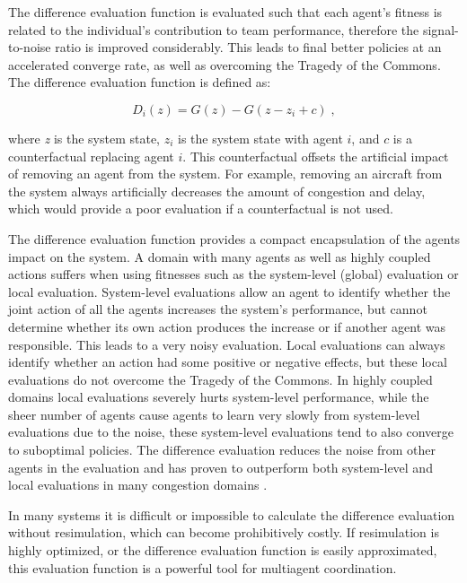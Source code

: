 \documentclass{sig-alternate}
\begin{document}
The difference evaluation function \cite{tumer-wolpert_jair02} is evaluated such that each agent's fitness is related to the individual's contribution to team performance, therefore the signal-to-noise ratio is improved considerably. This leads to final better policies at an accelerated converge rate, as well as overcoming the Tragedy of the Commons. The difference evaluation function is defined as:

\begin{equation}
D_i(z) = G(z) - G(z - z_i + c)\;,
\end{equation}

where \textit{z} is the system state, $z_i$ is the system state with agent $i$, and $c$ is a counterfactual replacing agent $i$. This counterfactual offsets the artificial impact of removing an agent from the system. For example, removing an aircraft from the system always artificially decreases the amount of congestion and delay, which would provide a poor evaluation if a counterfactual is not used.

The difference evaluation function provides a compact encapsulation of the agents impact on the system. A domain with many agents as well as highly coupled actions suffers when using fitnesses such as the system-level (global) evaluation or local evaluation. System-level evaluations allow an agent to identify whether the joint action of all the agents increases the system's performance, but cannot determine whether its own action produces the increase or if another agent was responsible. This leads to a very noisy evaluation. Local evaluations can always identify whether an action had some positive or negative effects, but these local evaluations do not overcome the Tragedy of the Commons. In highly coupled domains local evaluations severely hurts system-level performance, while the sheer number of agents cause agents to learn very slowly from system-level evaluations due to the noise, these system-level evaluations tend to also converge to suboptimal policies. The difference evaluation reduces the noise from other agents in the evaluation and has proven to outperform both system-level and local evaluations in many congestion domains \cite{tumer-agogino_jaamas08, tumer-wolpert_jair02}.

In many systems it is difficult or impossible to calculate the difference evaluation without resimulation, which can become prohibitively costly. If resimulation is highly optimized, or the difference evaluation function is easily approximated, this evaluation function is a powerful tool for multiagent coordination.
\end{document}
